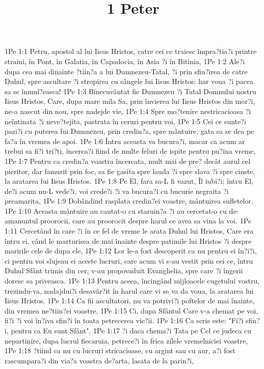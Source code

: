 

\title{1 Peter}

1Pe 1:1  Petru, apostol al lui Iisus Hristos, catre cei ce traiesc împra?tia?i printre straini, în Pont, în Galatia, în Capadocia, în Asia ?i în Bitinia,
1Pe 1:2  Ale?i dupa cea mai dinainte ?tiin?a a lui Dumnezeu-Tatal, ?i prin sfin?irea de catre Duhul, spre ascultare ?i stropirea cu sângele lui Iisus Hristos: har voua ?i pacea sa se înmul?easca!
1Pe 1:3  Binecuvântat fie Dumnezeu ?i Tatal Domnului nostru Iisus Hristos, Care, dupa mare mila Sa, prin învierea lui Iisus Hristos din mor?i, ne-a nascut din nou, spre nadejde vie,
1Pe 1:4  Spre mo?tenire nestricacioasa ?i neîntinata ?i neve?tejita, pastrata în ceruri pentru voi,
1Pe 1:5  Cei ce sunte?i pazi?i cu puterea lui Dumnezeu, prin credin?a, spre mântuire, gata sa se dea pe fa?a în vremea de apoi.
1Pe 1:6  Întru aceasta va bucura?i, macar ca acum ar trebui sa fi?i tri?ti, încerca?i fiind de multe feluri de ispite pentru pu?ina vreme,
1Pe 1:7  Pentru ca credin?a voastra încercata, mult mai de pre? decât aurul cel pieritor, dar lamurit prin foc, sa fie gasita spre lauda ?i spre slava ?i spre cinste, la aratarea lui Iisus Hristos.
1Pe 1:8  Pe El, fara sa-L fi vazut, Îl iubi?i; întru El, de?i acum nu-L vede?i, voi crede?i ?i va bucura?i cu bucurie negraita ?i preamarita,
1Pe 1:9  Dobândind rasplata credin?ei voastre, mântuirea sufletelor.
1Pe 1:10  Aceasta mântuire au cautat-o cu staruin?a ?i au cercetat-o cu de-amanuntul proorocii, care au proorocit despre harul ce avea sa vina la voi.
1Pe 1:11  Cercetând în care ?i în ce fel de vreme le arata Duhul lui Hristos, Care era întru ei, când le marturisea de mai înainte despre patimile lui Hristos ?i despre maririle cele de dupa ele,
1Pe 1:12  Lor le-a fost descoperit ca nu pentru ei în?i?i, ci pentru voi slujeau ei aceste lucruri, care acum vi s-au vestit prin cei ce, întru Duhul Sfânt trimis din cer, v-au propovaduit Evanghelia, spre care ?i îngerii doresc sa priveasca.
1Pe 1:13  Pentru aceea, încingând mijloacele cugetului vostru, trezindu-va, nadajdui?i desavâr?it în harul care vi se va da voua, la aratarea lui Iisus Hristos.
1Pe 1:14  Ca fii ascultatori, nu va potrivi?i poftelor de mai înainte, din vremea ne?tiin?ei voastre,
1Pe 1:15  Ci, dupa Sfântul Care v-a chemat pe voi, fi?i ?i voi în?iva sfin?i în toata petrecerea vie?ii.
1Pe 1:16  Ca scris este: "Fi?i sfin?i, pentru ca Eu sunt Sfânt".
1Pe 1:17  ?i daca chema?i Tata pe Cel ce judeca cu nepartinire, dupa lucrul fiecaruia, petrece?i în frica zilele vremelniciei voastre,
1Pe 1:18  ?tiind ca nu cu lucruri stricacioase, cu argint sau cu aur, a?i fost rascumpara?i din via?a voastra de?arta, lasata de la parin?i,
